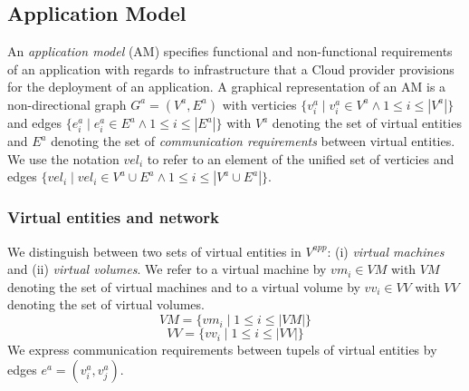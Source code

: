 \documentclass[conference]{IEEEtran}
\begin{document}
\subsection{Application Model}

An \textit{application model} (AM) specifies functional and non-functional requirements of an application with regards to infrastructure that a Cloud provider provisions for the deployment of an application.
A graphical representation of an AM is a non-directional graph $G^{a}=(V^{a},E^{a})$ with verticies $\{ v^{a}_i \mid v^{a}_i \in V^{a} \wedge 1 \leq i \leq \left\vert V^{a} \right\vert \}$ and edges $\{ e^{a}_i \mid e^{a}_i \in E^{a} \wedge 1 \leq i \leq \left\vert E^{a} \right\vert \}$ with $V^{a}$ denoting the set of virtual entities and $E^{a}$ denoting the set of \textit{communication requirements} between virtual entities.
We use the notation $vel_i$ to refer to an element of the unified set of verticies and edges $\{ vel_i \mid vel_i \in V^{a} \cup E^{a} \wedge 1 \leq i \leq \left\vert V^{a} \cup E^{a} \right\vert \}$.

\subsubsection{Virtual entities and network}

We distinguish between two sets of virtual entities in $V^{app}$: (i) \textit{virtual machines} and (ii) \textit{virtual volumes}. We refer to a virtual machine by $vm_i \in VM$ with $VM$ denoting the set of virtual machines and to a virtual volume by $vv_i \in VV$ with $VV$ denoting the set of virtual volumes.
\begin{equation}
VM = \{ vm_i \mid 1 \leq i \leq \left\vert VM \right\vert \}
\end{equation}
\begin{equation}
VV = \{ vv_i \mid 1 \leq i \leq \left\vert VV \right\vert \}
\end{equation}
We express communication requirements between tupels of virtual entities by edges $e^{a}=(v^{a}_i, v^{a}_j)$. 
\end{document}
